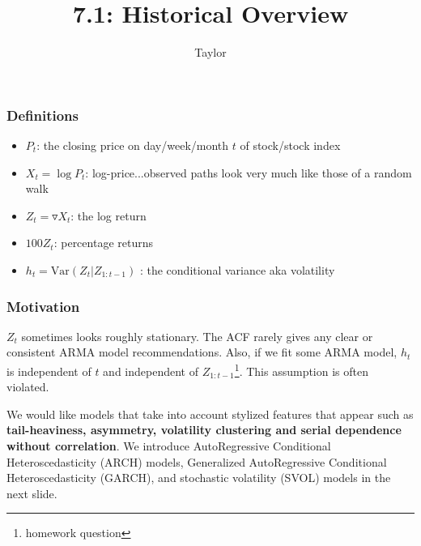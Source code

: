 \documentclass{beamer}
\title["7.1"]{7.1: Historical Overview}
\author{Taylor}
\institute[UVA] 
{
University of Virginia \\
\medskip
\textit{} 
}
\date{}
\begin{document}

\begin{frame}
\titlepage 
\end{frame}

\begin{frame}
\frametitle{Definitions}

\begin{itemize}
\item $P_t$: the closing price on day/week/month $t$ of stock/stock index
\item $X_t = \log P_t$: log-price...observed paths look very much like those of a random walk 
\item $Z_t = \triangledown X_t$: the log return
\item $100 Z_t$: percentage returns
\item $h_t = \text{Var}(Z_t|Z_{1:t-1})$ : the conditional variance aka volatility
\end{itemize}


\end{frame}


\begin{frame}
\frametitle{Motivation}

$Z_t$ sometimes looks roughly stationary. The ACF rarely gives any clear or consistent ARMA model recommendations. Also, if we fit some ARMA model, $h_t$ is independent of $t$ and independent of $Z_{1:t-1}$\footnote{homework question}. This assumption is often violated.
\newline

We would like models that take into account stylized features that appear such as {\bf tail-heaviness, asymmetry, volatility clustering and serial dependence without correlation}. We introduce AutoRegressive Conditional Heteroscedasticity (ARCH) models, Generalized AutoRegressive Conditional Heteroscedasticity (GARCH), and stochastic volatility (SVOL) models in the next slide.

\end{frame}

\end{document}
